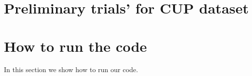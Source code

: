 \documentclass[11pt,twoside]{article}
\begin{document}
\begin{appendices}

    \section{Preliminary trials' for CUP dataset} %
    \label{sec:preliminary_trials_learning_curves_for_cup}


    \section{How to run the code} %
    \label{sec:how_to_run_the_code}
        In this section we show how to run our code.

\end{appendices}

\end{document}
